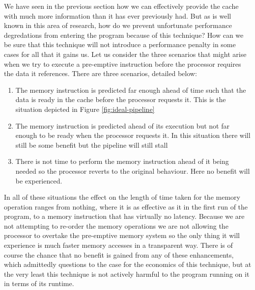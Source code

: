We have seen in the previous section how we can effectively provide the cache with much more information than it has ever previously had. But as is well known in this area of research, how do we prevent unfortunate performance degredations from entering the program because of this technique? How can we be sure that this technique will not introduce a performance penalty in some cases for all that it gains us. Let us consider the three scenarios that might arise when we try to execute a pre-emptive instruction before the processor requires the data it references. There are three scenarios, detailed below:

\begin{enumerate}[label=\textbf{Situation \arabic*}, align=left, leftmargin=*,labelindent=16pt]
	\item The memory instruction is predicted far enough ahead of time such that the data is ready in the cache before the processor requests it. This is the situation depicted in Figure \ref{fig:ideal-pipeline}
	\item The memory instruction is predicted ahead of its execution but not far enough to be ready when the processor requests it. In this situation there will still be some benefit but the pipeline will still stall
	\item There is not time to perform the memory instruction ahead of it being needed so the processor reverts to the original behaviour. Here no benefit will be experienced.
\end{enumerate}

In all of these situations the effect on the length of time taken for the memory operation ranges from nothing, where it is as effective as it in the first run of the program, to a memory instruction that has virtually no latency. Because we are not attempting to re-order the memory operations we are not allowing the processor to overtake the pre-emptive memory system so the only thing it will experience is much faster memory accesses in a transparent way. There is of course the chance that no benefit is gained from any of these enhancements, which admittedly questions to the case for the economics of this technique, but at the very least this technique is not actively harmful to the program running on it in terms of its runtime. 

